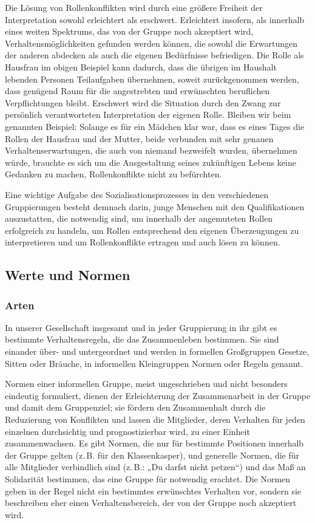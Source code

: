 \documentclass[12pt]{scrartcl}
\DeclareRobustCommand{\zB}{z.\,B.\xspace}
\begin{document}
Die Lösung von Rollenkonflikten wird durch eine größere Freiheit der
Interpretation sowohl erleichtert als erschwert. Erleichtert insofern, als
innerhalb eines weiten Spektrums, das von der Gruppe noch akzeptiert wird,
Verhaltensmöglichkeiten gefunden werden können, die sowohl die Erwartungen der
anderen abdecken als auch die eigenen Bedürfnisse befriedigen. Die Rolle als
Hausfrau im obigen Beispiel kann dadurch, dass die übrigen im Haushalt lebenden
Personen Teilaufgaben übernehmen, soweit zurückgenommen werden, dass genügend
Raum für die angestrebten und erwünschten beruflichen Verpflichtungen bleibt.
Erschwert wird die Situation durch den Zwang zur persönlich verantworteten
Interpretation der eigenen Rolle. Bleiben wir beim genannten Beispiel: Solange
es für ein Mädchen klar war, dass es eines Tages die Rollen der Hausfrau und
der Mutter, beide verbunden mit sehr genauen Verhaltenserwartungen, die auch
von niemand bezweifelt wurden, übernehmen würde, brauchte es sich um die
Ausgestaltung seines zukünftigen Lebens keine Gedanken zu machen,
Rollenkonflikte nicht zu befürchten.

Eine wichtige Aufgabe des Sozialisationsprozesses in den verschiedenen
Gruppierungen besteht demnach darin, junge Menschen mit den Qualifikationen
auszustatten, die notwendig sind, um innerhalb der angemuteten Rollen
erfolgreich zu handeln, um Rollen entsprechend den eigenen Überzeugungen zu
interpretieren und um Rollenkonflikte ertragen und auch lösen zu können.

\subsection{Werte und Normen}

\subsubsection{Arten}
In unserer Gesellschaft insgesamt und in jeder Gruppierung in ihr gibt es
bestimmte Verhaltensregeln, die das Zusammenleben bestimmen. Sie sind einander
über- und untergeordnet und werden in formellen Großgruppen Gesetze, Sitten
oder Bräuche, in informellen Kleingruppen Normen oder Regeln genannt.

Normen einer informellen Gruppe, meist ungeschrieben und nicht besonders
eindeutig formuliert, dienen der Erleichterung der Zusammenarbeit in der Gruppe
und damit dem Gruppenziel; sie fördern den Zusammenhalt durch die Reduzierung
von Konflikten und lassen die Mitglieder, deren Verhalten für jeden einzelnen
durchsichtig und prognostizierbar wird, zu einer Einheit zusammenwachsen. Es
gibt Normen, die nur für bestimmte Positionen innerhalb der Gruppe gelten (\zB
für den Klassenkasper), und generelle Normen, die für alle Mitglieder
verbindlich sind (\zB: „Du darfst nicht petzen“) und das Maß an Solidarität
bestimmen, das eine Gruppe für notwendig erachtet. Die Normen geben in der
Regel nicht ein bestimmtes erwünschtes Verhalten vor, sondern sie beschreiben
eher einen Verhaltensbereich, der von der Gruppe noch akzeptiert wird.
\end{document}
